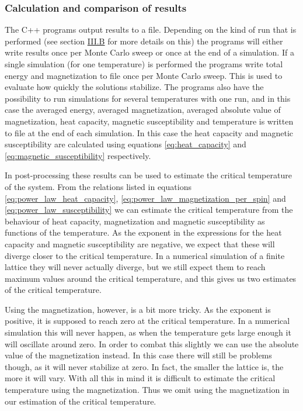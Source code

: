 \documentclass[reprint,english,notitlepage]{revtex4-1}  %
\begin{document}
\subsubsection{Calculation and comparison of results} \label{sec:III:a:iv}

The C++ programs output results to a file. Depending on the kind of run that is performed (see section \hyperref[sec:III:b]{III.B} for more details on this) the programs will either write results once per Monte Carlo sweep or once at the end of a simulation. If a single simulation (for one temperature) is performed the programs write total energy and magnetization to file once per Monte Carlo sweep. This is used to evaluate how quickly the solutions stabilize. The programs also have the possibility to run simulations for several temperatures with one run, and in this case the averaged energy, averaged magnetization, averaged absolute value of magnetization, heat capacity, magnetic susceptibility and temperature is written to file at the end of each simulation. In this case the heat capacity and magnetic susceptibility are calculated using equations \eqref{eq:heat_capacity} and \eqref{eq:magnetic_susceptibility} respectively.

In post-processing these results can be used to estimate the critical temperature of the system. From the relations listed in equations \eqref{eq:power_law_heat_capacity}, \eqref{eq:power_law_magnetization_per_spin} and \eqref{eq:power_law_susceptibility} we can estimate the critical temperature from the behaviour of heat capacity, magnetization and magnetic susceptibility as functions of the temperature. As the exponent in the expressions for the heat capacity and magnetic susceptibility are negative, we expect that these will diverge closer to the critical temperature. In a numerical simulation of a finite lattice they will never actually diverge, but we still expect them to reach maximum values around the critical temperature, and this gives us two estimates of the critical temperature. 

Using the magnetization, however, is a bit more tricky. As the exponent is positive, it is supposed to reach zero at the critical temperature. In a numerical simulation this will never happen, as when the temperature gets large enough it will oscillate around zero. In order to combat this slightly we can use the absolute value of the magnetization instead. In this case there will still be problems though, as it will never stabilize at zero. In fact, the smaller the lattice is, the more it will vary. With all this in mind it is difficult to estimate the critical temperature using the magnetization. Thus we omit using the magnetization in our estimation of the critical temperature.
\end{document}
